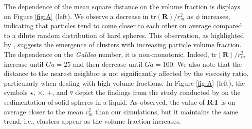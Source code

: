 The dependence of the mean square distance on the volume fraction is displays on Figure \ref{fig:A} (left). We observe a decrease in $\text{tr}(\textbf{R})/r_m^2$ as $\phi$ increases, indicating that particles tend to come closer to each other on average compared to a dilute random distribution of hard spheres. This observation, as highlighted by \citet{zhang2023evolution}, suggests the emergence of clusters with increasing particle volume fraction. 
The dependence on the \textit{Galileo} number, it is non-monotonic. 
Indeed, $\text{tr}(\textbf{R})/r_m^2$ increase until $Ga = 25$ and then decrease until $Ga = 100$. We also note that the distance to the nearest neighbor is not significantly affected by the viscosity ratio, particularly when dealing with high volume fractions.%
In Figure \ref{fig:A} (left), the symbols $\pmb\star$, $\pmb\times$, $\pmb +$, and $\pmb\triangledown$ depict the findings from the study conducted by \citet{zhang2023evolution} on the sedimentation of solid spheres in a liquid.
As observed, the value of $\textbf{R}:\textbf{I}$ is on average closer to the mean $r_m^2$ than our simulations, but it maintains the same trend, i.e., clusters appear as the volume fraction increases.

